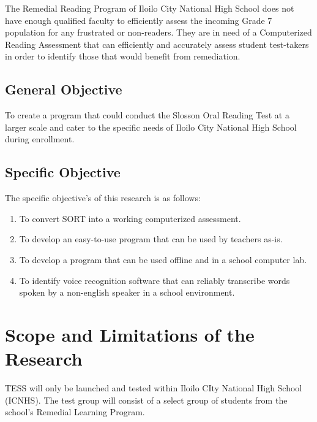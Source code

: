 The Remedial Reading Program of Iloilo City National High School does not have enough qualified faculty to efficiently assess the incoming Grade 7 population for any frustrated or non-readers. They are in need of a Computerized Reading Assessment that can efficiently and accurately assess student test-takers in order to identify those that would benefit from remediation.

\subsection{General Objective}
\label{sec:generalobjective}

To create a program that could conduct the Slosson Oral Reading Test at a larger scale and cater to the specific needs of Iloilo City National High School during enrollment.

\subsection{Specific Objective}
\label{sec:specificobjective}

The specific objective's of this research is as follows:
\begin{enumerate}
    \item To convert {SORT} into a working computerized assessment.
    \item To develop an easy-to-use program that can be used by teachers as-is.
    \item To develop a program that can be used offline and in a school computer lab.
    \item To identify voice recognition software that can reliably transcribe words spoken by a non-english speaker in a school environment.
\end{enumerate}

\section{Scope and Limitations of the Research}
\label{sec:scopelimitations}

TESS will only be launched and tested within Iloilo CIty National High School (ICNHS). The test group will consist of a select group of students from the school’s Remedial Learning Program.



